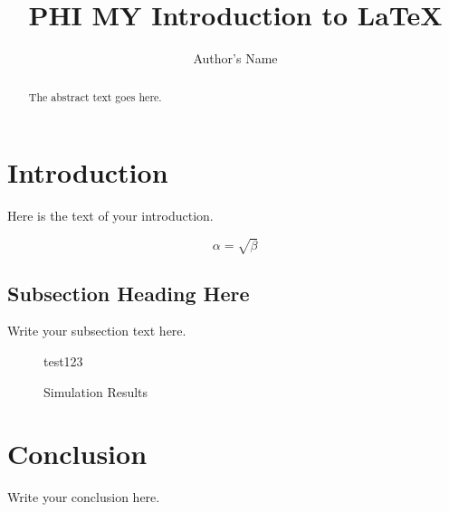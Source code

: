 \documentclass{article}
\begin{document}
\title{PHI MY Introduction to \LaTeX{}}
\author{Author's Name}

\maketitle

\begin{abstract}
The abstract text goes here.
\end{abstract}

\section{Introduction}
Here is the text of your introduction.

\begin{equation}
    \label{simple_equation}
    \alpha = \sqrt{ \beta }
\end{equation}

\subsection{Subsection Heading Here}
Write your subsection text here.

\begin{figure}
    \centering
    test123
    \caption{Simulation Results}
    \label{simulationfigure}
\end{figure}

\section{Conclusion}
Write your conclusion here.
\end{document}
